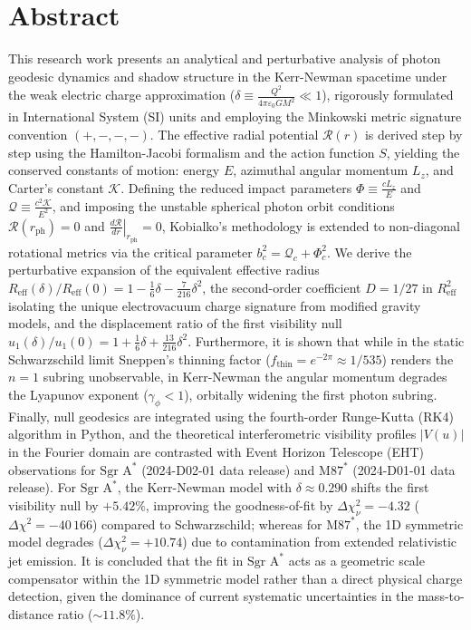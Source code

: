 \chapter*{\hfill{\centering Abstract}\hfill}
\vspace{0.5cm}
\justify
\normalsize

This research work presents an analytical and perturbative analysis of photon geodesic dynamics and shadow structure in the Kerr-Newman spacetime under the weak electric charge approximation ($\delta \equiv \frac{Q^2}{4\pi\varepsilon_0 G M^2} \ll 1$), rigorously formulated in International System (SI) units and employing the Minkowski metric signature convention $(+,-,-,-)$. The effective radial potential $\mathcal{R}(r)$ is derived step by step using the Hamilton-Jacobi formalism and the action function $S$, yielding the conserved constants of motion: energy $E$, azimuthal angular momentum $L_z$, and Carter's constant $\mathcal{K}$. Defining the reduced impact parameters $\Phi \equiv \frac{c L_z}{E}$ and $\mathcal{Q} \equiv \frac{c^2 \mathcal{K}}{E^2}$, and imposing the unstable spherical photon orbit conditions $\mathcal{R}(r_{\mathrm{ph}}) = 0$ and $\left.\frac{d\mathcal{R}}{dr}\right|_{r_{\mathrm{ph}}} = 0$, Kobialko's methodology is extended to non-diagonal rotational metrics via the critical parameter $b_c^2 = \mathcal{Q}_c + \Phi_c^2$. We derive the perturbative expansion of the equivalent effective radius $R_{\mathrm{eff}}(\delta)/R_{\mathrm{eff}}(0) = 1 - \frac{1}{6}\delta - \frac{7}{216}\delta^2$, the second-order coefficient $D = 1/27$ in $R_{\mathrm{eff}}^2$ isolating the unique electrovacuum charge signature from modified gravity models, and the displacement ratio of the first visibility null $u_1(\delta)/u_1(0) = 1 + \frac{1}{6}\delta + \frac{13}{216}\delta^2$. Furthermore, it is shown that while in the static Schwarzschild limit Sneppen's thinning factor ($f_{\mathrm{thin}} = e^{-2\pi} \approx 1/535$) renders the $n=1$ subring unobservable, in Kerr-Newman the angular momentum degrades the Lyapunov exponent ($\gamma_\phi < 1$), orbitally widening the first photon subring. Finally, null geodesics are integrated using the fourth-order Runge-Kutta (RK4) algorithm in Python, and the theoretical interferometric visibility profiles $|V(u)|$ in the Fourier domain are contrasted with Event Horizon Telescope (EHT) observations for $\text{Sgr A}^*$ (2024-D02-01 data release) and $\text{M87}^*$ (2024-D01-01 data release). For $\text{Sgr A}^*$, the Kerr-Newman model with $\delta \approx 0.290$ shifts the first visibility null by $+5.42\%$, improving the goodness-of-fit by $\Delta\chi^2_\nu = -4.32$ ($\Delta\chi^2 = -40\,166$) compared to Schwarzschild; whereas for $\text{M87}^*$, the 1D symmetric model degrades ($\Delta\chi^2_\nu = +10.74$) due to contamination from extended relativistic jet emission. It is concluded that the fit in $\text{Sgr A}^*$ acts as a geometric scale compensator within the 1D symmetric model rather than a direct physical charge detection, given the dominance of current systematic uncertainties in the mass-to-distance ratio ($\sim 11.8\%$).


